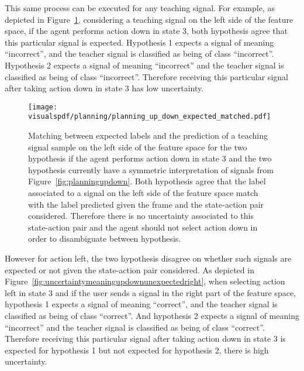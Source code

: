 This same process can be executed for any teaching signal. For example, as depicted in Figure~\ref{fig:uncertaintymeaningupdownexpectedleft}, considering a teaching signal on the left side of the feature space, if the agent performs action down in state 3, both hypothesis agree that this particular signal is expected. Hypothesis 1 expects a signal of meaning ``incorrect'', and the teacher signal is classified as being of class ``incorrect''. Hypothesis 2 expects a signal of meaning ``incorrect'' and the teacher signal is classified as being of class ``incorrect''. Therefore receiving this particular signal after taking action down in state 3 has low uncertainty.

\begin{figure}[!ht]
  \centering
  \texttt{[image: \\visualspdf/planning/planning\_up\_down\_expected\_matched.pdf]}
  \caption{Matching between expected labels and the prediction of a teaching signal sample on the left side of the feature space for the two hypothesis if the agent performs action down in state 3 and the two hypothesis currently have a symmetric interpretation of signals from Figure~\ref{fig:planningupdown}. Both hypothesis agree that the label associated to a signal on the left side of the feature space match with the label predicted given the frame and the state-action pair considered. Therefore there is no uncertainty associated to this state-action pair and the agent should not select action down in order to disambiguate between hypothesis.}
  \label{fig:uncertaintymeaningupdownexpectedleft}
\end{figure}

However for action left, the two hypothesis disagree on whether such signals are expected or not given the state-action pair considered. As depicted in Figure~\ref{fig:uncertaintymeaningupdownunexpectedright}, when selecting action left in state 3 and if the user sends a signal in the right part of the feature space, hypothesis 1 expects a signal of meaning ``correct'', and the teacher signal is classified as being of class ``correct''. And hypothesis 2 expects a signal of meaning ``incorrect'' and the teacher signal is classified as being of class ``correct''. Therefore receiving this particular signal after taking action down in state 3 is expected for hypothesis 1 but not expected for hypothesis 2, there is high uncertainty.

